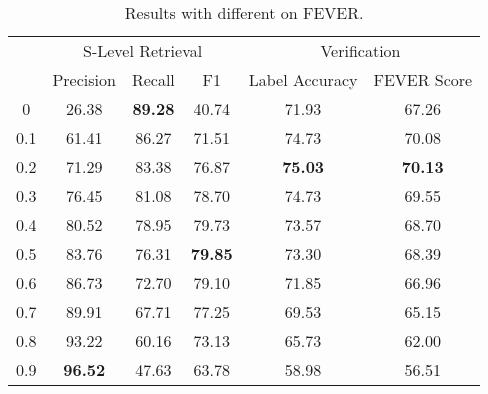 \documentclass[11pt,a4paper]{article}
\newcommand\fever{FEVER\xspace}
\begin{document}
\begin{table*}[t]
\centering
\begin{tabular}{cccccc}
\toprule
\multirow{2}{*}{} &
\multicolumn{3}{c}{S-Level Retrieval} &
\multicolumn{2}{c}{Verification} \\ 
\cmidrule(lr){2-4}
\cmidrule(lr){5-6}
& Precision & Recall & F1 & Label Accuracy & FEVER Score\\
\midrule

0   & 26.38 & \textbf{89.28} & 40.74 & 71.93 & 67.26\\
0.1 & 61.41 & 86.27 & 71.51 & 74.73 & 70.08\\
0.2 & 71.29 & 83.38 & 76.87 & \textbf{75.03} & \textbf{70.13}\\
0.3 & 76.45 & 81.08 & 78.70 & 74.73 & 69.55\\
0.4 & 80.52 & 78.95 & 79.73 & 73.57 & 68.70\\
0.5 & 83.76 & 76.31 & \textbf{79.85} & 73.30 & 68.39\\
0.6 & 86.73 & 72.70 & 79.10 & 71.85 & 66.96\\
0.7 & 89.91 & 67.71 & 77.25 & 69.53 & 65.15\\
0.8 & 93.22 & 60.16 & 73.13 & 65.73 & 62.00\\
0.9 & \textbf{96.52} & 47.63 & 63.78 & 58.98 & 56.51\\
\bottomrule
\end{tabular}
\caption{Results with different  on \fever.}
\label{tab:fever_detail_s_level_results}
\end{table*}
\end{document}
